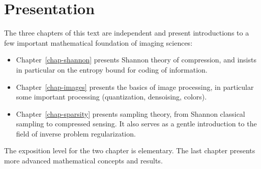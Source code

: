 
\chapter*{Presentation}

The three chapters of this text are independent and present introductions to a few important mathematical foundation of imaging sciences:
\begin{itemize}
	\item Chapter~\ref{chap-shannon} presents Shannon theory of compression, and insists in particular on the entropy bound for coding of information.
	\item Chapter~\ref{chap-images} presents the basics of image processing, in particular some important processing (quantization, densoising, colors).
	\item Chapter~\ref{chap-sparsity} presents sampling theory, from Shannon classical sampling to compressed sensing. It also serves as a gentle introduction to the field of inverse problem regularization.
\end{itemize}
The exposition level for the two chapter is elementary. The last chapter presents more advanced mathematical concepts and results. 

\tableofcontents
